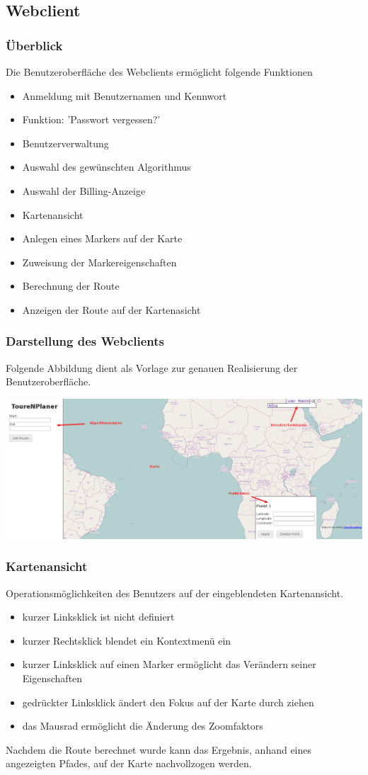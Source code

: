 \documentclass[a4paper,10pt,titlepage]{article}
\begin{document}
\subsection{Webclient}

\subsubsection{Überblick}
Die Benutzeroberfläche des Webclients ermöglicht folgende Funktionen
\begin{itemize}
\item Anmeldung mit Benutzernamen und Kennwort
\item Funktion: ’Passwort vergessen?’
\item Benutzerverwaltung
\item Auswahl des gewünschten Algorithmus
\item Auswahl der Billing-Anzeige 
\item Kartenansicht
\item Anlegen eines Markers auf der Karte
\item Zuweisung der Markereigenschaften
\item Berechnung der Route
\item Anzeigen der Route auf der Kartenasicht
\end{itemize}

\subsubsection{Darstellung des Webclients}
Folgende Abbildung dient als Vorlage zur genauen Realisierung der Benutzeroberfläche.

\includegraphics[scale=0.30]{media/web/Index.png} 

\subsubsection{Kartenansicht}
Operationsmöglichkeiten des Benutzers auf der eingeblendeten Kartenansicht.
\begin {itemize}
\item kurzer Linksklick ist nicht definiert
\item kurzer Rechtsklick blendet ein Kontextmenü ein
\item kurzer Linksklick auf einen Marker ermöglicht das Verändern seiner Eigenschaften
\item gedrückter Linksklick ändert den Fokus auf der Karte durch ziehen
\item das Mausrad ermöglicht die Änderung des Zoomfaktors
\end {itemize}
Nachdem die Route berechnet wurde kann das Ergebnis, anhand eines angezeigten Pfades, auf der Karte nachvollzogen werden.
\end{document}
